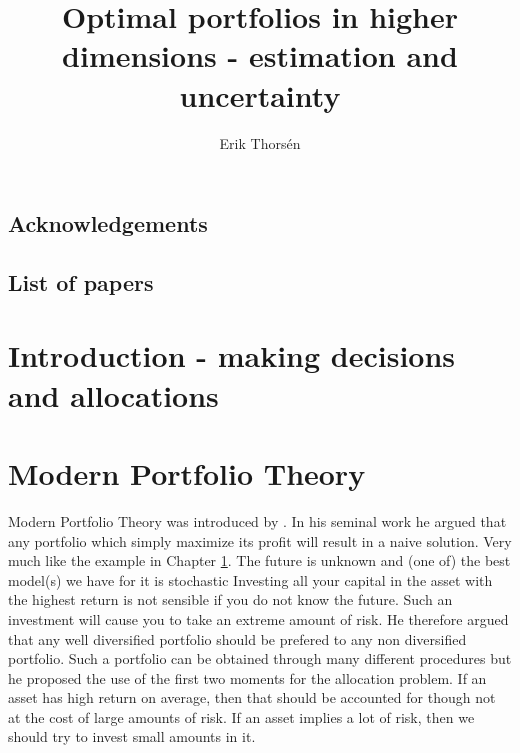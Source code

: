 \documentclass[]{book}\usepackage{knitr}
\title{Optimal portfolios in higher dimensions - estimation and uncertainty}
\author{Erik Thorsén}
\begin{document}


\maketitle

\section*{Acknowledgements}

\newpage
\section*{List of papers}



\tableofcontents
\chapter[Introduction]{Introduction - making decisions and allocations}\label{ch:intro}

\chapter{Modern Portfolio Theory}\label{ch:MPT}


Modern Portfolio Theory was introduced by \cite{markowitz1959portfolio}. 
In his seminal work he argued that any portfolio which simply maximize its profit will result in a naive solution.
Very much like the example in Chapter \ref{ch:intro}. 
The future is unknown and (one of) the best model(s) we have for it is stochastic
Investing all your capital in the asset with the highest return is not sensible if you do not know the future.
Such an investment will cause you to take an extreme amount of risk. 
He therefore argued that any well diversified portfolio should be prefered to any non diversified portfolio. 
Such a portfolio can be obtained through many different procedures but he proposed the use of the first two moments for the allocation problem.
If an asset has high return on average, then that should be accounted for though not at the cost of large amounts of risk. If an asset implies a lot of risk, then we should try to invest small amounts in it.
\end{document}
